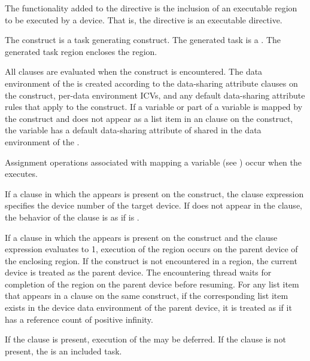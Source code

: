 The functionality added to the  directive is the inclusion of an executable region to be executed by a device. That is, the  directive is an executable directive.

The  construct is a task generating construct.  The generated task is a .  The generated task region encloses the  region.

All clauses are evaluated when the  construct is encountered.
The data environment of the  is created according to the
data-sharing attribute clauses on the  construct, per-data
environment ICVs, and any default data-sharing attribute rules that apply to
the  construct.  If a variable or part of a variable is mapped by
the  construct and does not appear as a list item in an
 clause on the construct, the variable has a default
data-sharing attribute of shared in the data environment of the .

Assignment operations associated with mapping a variable (see ) occur when the  executes.

If a  clause in which the   appears is present on the construct, the
 clause expression specifies the device number of the target device. If
 does not appear in the clause, the behavior of the
clause is as if  is .

If a  clause in which the   appears is present on the
 construct and the  clause expression evaluates to 1,
execution of the  region occurs on the parent device of the
enclosing  region.  If the  construct is not
encountered in a  region, the current device is treated as the
parent device.  The encountering thread waits for completion of the
 region on the parent device before resuming. For any list item
that appears in a  clause on the same construct, if the
corresponding list item exists in the device data environment of the parent
device, it is treated as if it has a reference count of positive infinity.

If the  clause is present, execution of the  may be deferred.  If the  clause is not present, the  is an included task.

